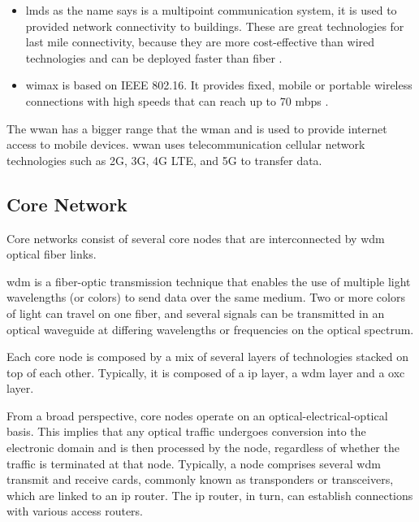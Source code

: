 \begin{itemize}

    \item \ac{lmds} as the name says is a multipoint communication system, it is used to provided network connectivity to buildings. These are great technologies for last mile connectivity, because they are more cost-effective than wired technologies and can be deployed faster than fiber \cite{forum:imda}.

    \item \ac{wimax}  is based on IEEE 802.16. It provides fixed, mobile or portable wireless connections with high speeds that can reach up to 70 \ac{mbps} \cite{forum:ctrfantennasinc}.

\end{itemize}

The \ac{wwan} has a bigger range that the \ac{wman} and is used to provide internet access to mobile devices.
\ac{wwan} uses telecommunication cellular network technologies such as 2G, 3G, 4G LTE, and 5G to transfer data.


\subsection{Core Network}

Core networks consist of several core nodes that are interconnected by \ac{wdm} optical fiber links.

\ac{wdm} is a fiber-optic transmission technique that enables the use of multiple light wavelengths (or colors) to send data over the same medium. Two or more colors of light can travel on one fiber, and several signals can be transmitted in an optical waveguide at differing wavelengths or frequencies on the optical spectrum. 

Each core node is composed by a mix of several layers of technologies stacked on top of each other. Typically, it is composed of a \ac{ip} layer, a \ac{wdm} layer and a \ac{oxc} layer.

From a broad perspective, core nodes operate on an optical-electrical-optical basis. This implies that any optical traffic undergoes conversion into the electronic domain and is then processed by the node, regardless of whether the traffic is terminated at that node. Typically, a node comprises several \ac{wdm} transmit and receive cards, commonly known as transponders or transceivers, which are linked to an \ac{ip} router. The \ac{ip} router, in turn, can establish connections with various access routers.

